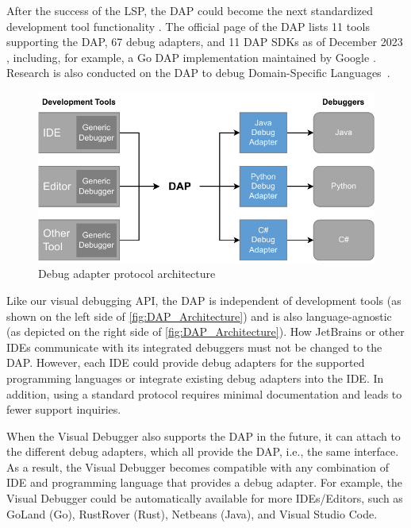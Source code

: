 \documentclass[sigconf]{acmart}
\begin{document}
After the success of the LSP, the DAP could become the next standardized development tool functionality \cite{raskVisualStudioCode2020,borkLanguageServerProtocol2023}.
The official page of the DAP lists 11 tools supporting the DAP, 67 debug adapters, and 11 DAP SDKs as of December 2023 \cite{microsoftDebugAdapterProtocol2023}, including, for example, a Go DAP implementation maintained by Google \cite{googleGoImplementationDebug2023}.
Research is also conducted on the DAP to debug Domain-Specific Languages~\cite{jeanjeanIDECodeReifying2021,enetProtocolBasedInteractiveDebugging2023}.

\begin{figure}[ht]
  \centering
  \includegraphics[width=1\linewidth]{images/visual-debugger-DAP-architecture.pdf}
  \caption{Debug adapter protocol architecture \cite{microsoftDebugAdapterProtocol2023}}
  \label{fig:DAP_Architecture}
\end{figure}

Like our visual debugging API, the DAP is independent of development tools (as shown on the left side of \autoref{fig:DAP_Architecture}) and is also language-agnostic (as depicted on the right side of \autoref{fig:DAP_Architecture}).
How JetBrains or other IDEs communicate with its integrated debuggers must not be changed to the DAP.
However, each IDE could provide debug adapters for the supported programming languages or integrate existing debug adapters into the IDE.
In addition, using a standard protocol requires minimal documentation and leads to fewer support inquiries.

When the Visual Debugger also supports the DAP in the future, it can attach to the different debug adapters, which all provide the DAP, i.e., the same interface.
As a result, the Visual Debugger becomes compatible with any combination of IDE and programming language that provides a debug adapter.
For example, the Visual Debugger could be automatically available for more IDEs/Editors, such as GoLand (Go), RustRover (Rust), Netbeans (Java), and Visual Studio Code.
\end{document}
